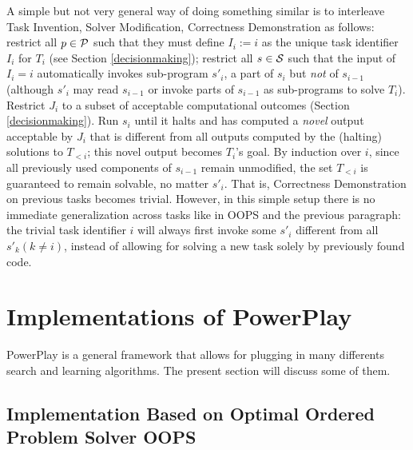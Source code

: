 \documentclass{article}
\begin{document}
A simple but not very general way of doing something similar is to 
interleave {\sc Task Invention}, {\sc Solver Modification}, {\sc Correctness Demonstration} as follows:
restrict all $p \in \cal P$ such that they must define $I_i:=i$ as the unique task identifier $I_i$ for $T_i$ (see Section \ref{decisionmaking});
restrict all $s \in \cal S$ such that  the input of $I_i=i$ automatically  invokes sub-program $s'_i$, a part of $s_i$ but {\em not} of $s_{i-1}$ 
(although  $s'_i$ may read $s_{i-1}$ or invoke parts of $s_{i-1}$ as sub-programs to solve $T_i$).
Restrict $J_i$ to a subset of acceptable computational outcomes (Section \ref{decisionmaking}).
Run $s_i$ until it halts and has computed a {\em novel} output acceptable by $J_i$ that is 
different from all outputs computed
by the (halting) solutions to $T_{< i}$;
this novel output becomes $T_i$'s goal.
By induction over $i$,
since  all previously used components of $s_{i-1}$ remain unmodified, the set $T_{< i}$ 
is guaranteed to remain solvable, no matter $s'_i$.  That is, {\sc Correctness Demonstration} on previous tasks
becomes trivial. However, in this simple setup 
there is no immediate generalization across tasks like in OOPS \cite{Schmidhuber:04oops} and the previous paragraph:
the trivial task identifier
$i$ will always first invoke some $s'_i$ different from all $s'_k (k\neq i)$, instead of allowing for solving a new task 
solely by previously found code.


\section{Implementations of {\sc PowerPlay}}
\label{implement}

{\sc PowerPlay} is a general framework that allows for plugging in many differents search and learning algorithms.
The present section will discuss some of them.

\subsection{Implementation Based on Optimal Ordered Problem Solver OOPS}
\label{oops}
\end{document}
